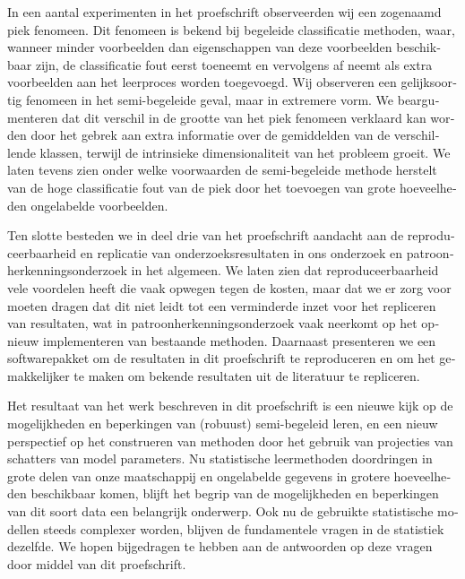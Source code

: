 \begin{otherlanguage}{dutch}
In een aantal experimenten in het proefschrift observeerden wij een zogenaamd piek fenomeen. Dit fenomeen is bekend bij begeleide classificatie methoden, waar, wanneer minder voorbeelden dan eigenschappen van deze voorbeelden beschikbaar zijn, de classificatie fout eerst toeneemt en vervolgens af neemt als extra voorbeelden aan het leerproces worden toegevoegd. Wij observeren een gelijksoortig fenomeen in het semi-begeleide geval, maar in extremere vorm. We beargumenteren dat dit verschil in de grootte van het piek fenomeen verklaard kan worden door het gebrek aan extra informatie over de gemiddelden van de verschillende klassen, terwijl de intrinsieke dimensionaliteit van het probleem groeit. We laten tevens zien onder welke voorwaarden de semi-begeleide methode herstelt van de hoge classificatie fout van de piek door het toevoegen van grote hoeveelheden ongelabelde voorbeelden.

Ten slotte besteden we in deel drie van het proefschrift aandacht aan de reproduceerbaarheid en replicatie van onderzoeksresultaten in ons onderzoek en patroonherkenningsonderzoek in het algemeen. We laten zien dat reproduceerbaarheid vele voordelen heeft die vaak opwegen tegen de kosten, maar dat we er zorg voor moeten dragen dat dit niet leidt tot een verminderde inzet voor het repliceren van resultaten, wat in patroonherkenningsonderzoek vaak neerkomt op het opnieuw implementeren van bestaande methoden. Daarnaast presenteren we een softwarepakket om de resultaten in dit proefschrift te reproduceren en om het gemakkelijker te maken om bekende resultaten uit de literatuur te repliceren.

Het resultaat van het werk beschreven in dit proefschrift is een nieuwe kijk op de mogelijkheden en beperkingen van (robuust) semi-begeleid leren, en een nieuw perspectief op het construeren van methoden door het gebruik van projecties van schatters van model parameters. Nu statistische leermethoden doordringen in grote delen van onze maatschappij en ongelabelde gegevens in grotere hoeveelheden beschikbaar komen, blijft het begrip van de mogelijkheden en beperkingen van dit soort data een belangrijk onderwerp. Ook nu de gebruikte statistische modellen steeds complexer worden, blijven de fundamentele vragen in de statistiek dezelfde. We hopen bijgedragen te hebben aan de antwoorden op deze vragen door middel van dit proefschrift. 
\end{otherlanguage}
